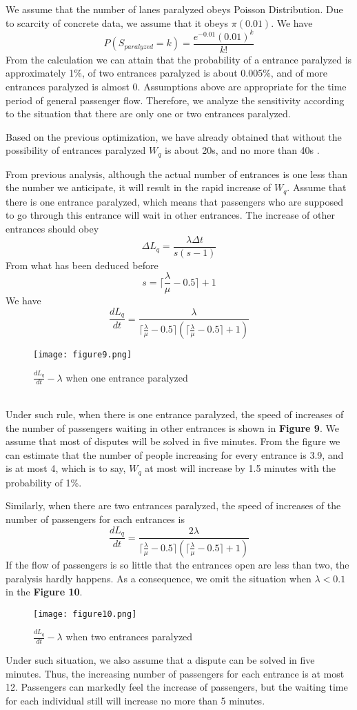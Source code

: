 \documentclass{mcmthesis}
\begin{document}
	We assume that the number of lanes paralyzed obeys Poisson Distribution. Due to scarcity of concrete data, we assume that it obeys $\pi(0.01)$. We have
	$$P(S_{paralyzed}=k)=\frac{e^{-0.01}(0.01)^k}{k!}$$
	From the calculation we can attain that the probability of a entrance paralyzed is approximately 1\%, of two entrances paralyzed is about 0.005\%, and of more entrances paralyzed is almost 0. Assumptions above are appropriate for the time period of general passenger flow. Therefore, we analyze the sensitivity according to the situation that there are only one or two entrances paralyzed.
	
	Based on the previous optimization, we have already obtained that without the possibility of entrances paralyzed $W_q$ is about 20s, and no more than 40s .

	From previous analysis, although the actual number of entrances is one less than the number we anticipate, it will result in the rapid increase of $W_q$. Assume that there is one entrance paralyzed, which means that passengers who are supposed to go through this entrance will wait in other entrances. The increase of other entrances should obey
	$$\Delta L_q=\frac{\lambda\Delta t}{s(s-1)}$$
	From what has been deduced before
	$$s=\lceil\frac{\lambda}{\mu}-0.5\rceil+1$$
	We have
	$$\frac{dL_q}{dt}=\frac{\lambda}{\lceil\frac{\lambda}{\mu}-0.5\rceil(\lceil\frac{\lambda}{\mu}-0.5\rceil +1)}$$
	\begin{figure}[h]
		\small
		\centering
		\texttt{[image: figure9.png]}
		\caption{$\frac{dL_q}{dt}-\lambda$ when one entrance paralyzed} \label{fig:9}
	\end{figure}\\
	Under such rule, when there is one entrance paralyzed, the speed of increases of the number of passengers waiting in other entrances is shown in \textbf{Figure 9}. We assume that most of disputes will be solved in five minutes. From the figure we can estimate that the number of people increasing for every entrance is 3.9, and is at most 4, which is to say, $W_q$ at most will increase by 1.5 minutes with the probability of 1\%.
	
	Similarly, when there are two entrances paralyzed, the speed of increases of the number of passengers for each entrances is
	$$\frac{dL_q}{dt}=\frac{2\lambda}{\lceil\frac{\lambda}{\mu}-0.5\rceil(\lceil\frac{\lambda}{\mu}-0.5\rceil +1)}$$
	If the flow of passengers is so little that the entrances open are less than two, the paralysis hardly happens. As a consequence, we omit the situation when $\lambda<0.1$ in the \textbf{Figure 10}.
	\begin{figure}[h]
		\small
		\centering
		\texttt{[image: figure10.png]}
		\caption{$\frac{dL_q}{dt}-\lambda$ when two entrances paralyzed} \label{fig:10}
	\end{figure}
	Under such situation, we also assume that a dispute can be solved in five minutes. Thus, the increasing number of passengers for each entrance is at most 12. Passengers can markedly feel the increase of passengers, but the waiting time for each individual still will increase no more than 5 minutes.
	
\end{document}
